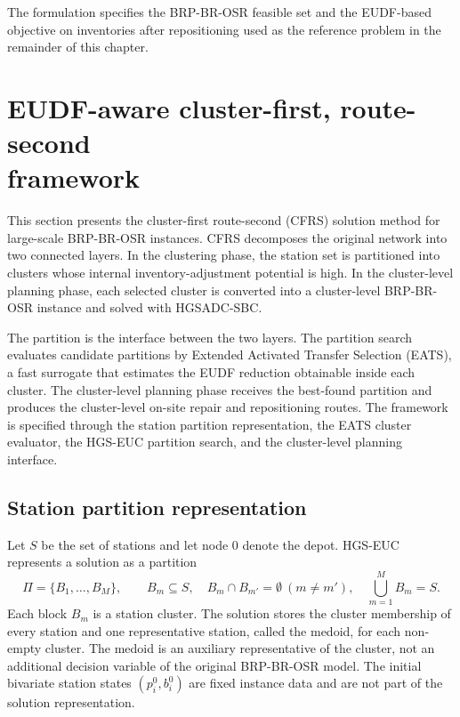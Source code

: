 The formulation specifies the BRP-BR-OSR feasible set and the EUDF-based
objective on inventories after repositioning used as the reference problem in the
remainder of this chapter.


\section[EUDF-aware cluster-first, route-second framework]{EUDF-aware cluster-first, route-second\\ framework}\label{ch5:sec:eudf-aware-cfrs-framework}\label{ch5:sec:methodology}\label{ch5:sec:framework}\label{ch5:sec:cfrs-framework}

This section presents the cluster-first route-second (CFRS) solution method for
large-scale BRP-BR-OSR instances. CFRS decomposes the original network into two
connected layers. In the clustering phase, the station set is partitioned into clusters whose
internal inventory-adjustment potential is high. In the cluster-level planning
phase, each selected cluster is converted into a cluster-level BRP-BR-OSR
instance and solved with HGSADC-SBC.

The partition is the interface between the two layers. The partition search
evaluates candidate partitions by Extended Activated Transfer Selection (EATS),
a fast surrogate that estimates the EUDF reduction obtainable inside each
cluster. The cluster-level planning phase receives the best-found partition and produces the
cluster-level on-site repair and repositioning routes. The framework is specified through the station partition representation, the EATS cluster evaluator, the HGS-EUC partition search, and the cluster-level planning interface.

\subsection{Station partition representation}\label{ch5:sec:hgs-euc-representation}

Let $S$ be the set of stations and let node $0$ denote the depot. HGS-EUC
represents a solution as a partition
\begin{equation}
\Pi=\{B_1,\ldots,B_M\},
\qquad
B_m\subseteq S,
\quad
B_m\cap B_{m'}=\emptyset\ (m\ne m'),
\quad
\bigcup_{m=1}^{M}B_m=S.
\label{ch5:eq:cfrs-partition}
\end{equation}
Each block $B_m$ is a station cluster. The solution stores the cluster
membership of every station and one representative station, called the medoid,
for each non-empty cluster. The medoid is an auxiliary representative of the
cluster, not an additional decision variable of the original BRP-BR-OSR model.
The initial bivariate station states $(p_i^0,b_i^0)$ are fixed instance data and
are not part of the solution representation.


